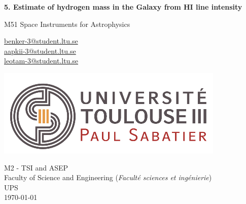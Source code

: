 \begin{titlepage}
    \begin{center}
    
        \vspace*{1cm}
        \Huge
        \textbf{
        5. Estimate of hydrogen mass in the Galaxy from HI line intensity}
            
        \vspace{0.5cm}
        \LARGE
        M51 Space Instruments for Astrophysics

            
        \vspace{2cm}
        \Large
        \begin{flushleft}
                \tab\url{benker-3@student.ltu.se} \\
                  \tab\url{aapkii-3@student.ltu.se} \\
                  \tab\url{leotam-3@student.ltu.se}            
            
        \end{flushleft}
            
        \vfill
            
        \includegraphics[width=0.5\linewidth]{Graphics/Vignette logo.png}
        \vfill
   
        
        \begin{flushleft}
            \large
            M2 - \ac{TSI} and \ac{ASEP} \\
            Faculty of Science and Engineering (\textit{Faculté sciences et ingénierie}) \\
            \ac{UPS} \\
            \today
        \end{flushleft}
                   
            
    \end{center}
\end{titlepage}